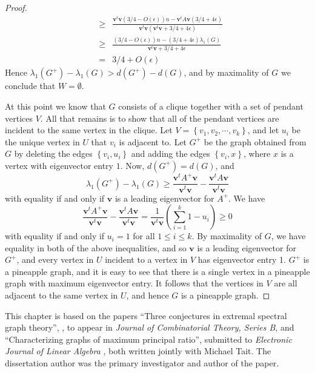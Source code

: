 \begin{proof}
\begin{eqnarray*}
 &\geq& \frac{\textbf{v}^t\textbf{v}(3/4-O(\epsilon))n - \textbf{v}^tA\textbf{v} (3/4 + 4\epsilon)}{\textbf{v}^t\textbf{v} (\textbf{v}^t\textbf{v} + 3/4 + 4\epsilon)}\\
 &\geq & \frac{(3/4-O(\epsilon))n - (3/4 + 4\epsilon)\lambda_1(G)}{\textbf{v}^t\textbf{v} + 3/4 + 4\epsilon} \\ 
 &= &  3/4 + O(\epsilon)
\end{eqnarray*}
Hence $\lambda_1(G^+) - \lambda_1(G) > d(G^+) - d(G)$, and by maximality of $G$ we conclude that $W = \emptyset$.

At this point we know that $G$ consists of a clique together with a set of pendant vertices $V$.  All that remains is to show that all of the pendant vertices  are incident to the same vertex in the clique.  Let $V = \left\{v_1, v_2, \cdots, v_k\right\}$, and let $u_i$ be the unique vertex in $U$ that $v_i$ is adjacent to.  Let $G^+$ be the graph obtained from $G$ by deleting the edges $\left\{v_i,u_i\right\}$ and adding the edges $\left\{v_i,x\right\}$, where $x$ is a vertex with eigenvector entry $1$.  Now, $d(G^+) = d(G)$, and 
\[ \lambda_1(G^+) -\lambda_1(G) \geq \frac{\textbf{v}^t A^+ \textbf{v}}{\textbf{v}^t\textbf{v}} - \frac{\textbf{v}^t A \textbf{v}}{\textbf{v}^t\textbf{v}}\]
with equality if and only if $\textbf{v}$ is a leading eigenvector for $A^+$.  We have
\[\frac{\textbf{v}^t A^+ \textbf{v}}{\textbf{v}^t\textbf{v}} - \frac{\textbf{v}^t A \textbf{v}}{\textbf{v}^t\textbf{v}} = \frac{1}{\textbf{v}^t\textbf{v}}\left( \sum_{i=1}^k 1 - u_i \right) \geq 0\]
with equality if and only if $u_i = 1$ for all $1 \leq i \leq k$.  By maximality of $G$, we have equality in both of the above inequalities, and so $\textbf{v}$ is a leading eigenvector for $G^+$, and every vertex in $U$ incident to a vertex in $V$ has eigenvector entry 1.  $G^+$ is a pineapple graph, and it is easy to see that there is a single vertex in a pineapple graph with maximum eigenvector entry.  It follows that the vertices in $V$ are all adjacent to the same vertex in $U$, and hence $G$ is a pineapple graph.

\end{proof}


This chapter is based on the papers ``Three conjectures in extremal spectral graph theory'',
 \cite{TaitTobin2017}, to appear in \textit{Journal of Combinatorial Theory, Series B},
 and ``Characterizing graphs of maximum principal ratio'', submitted to
 \textit{Electronic Journal of Linear Algebra} \cite{TaitTobin2015},
both written jointly with Michael Tait.  The dissertation
author was the primary investigator and author of the paper.

